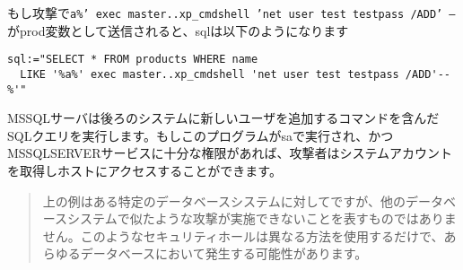 もし攻撃で\texttt{a\%' exec master..xp\_cmdshell 'net user test testpass /ADD' --}がprod変数として送信されると、sqlは以下のようになります


\begin{lstlisting}[numbers=none]
sql:="SELECT * FROM products WHERE name
  LIKE '%a%' exec master..xp_cmdshell 'net user test testpass /ADD'--%'"
\end{lstlisting}

MSSQLサーバは後ろのシステムに新しいユーザを追加するコマンドを含んだSQLクエリを実行します。もしこのプログラムがsaで実行され、かつMSSQLSERVERサービスに十分な権限があれば、攻撃者はシステムアカウントを取得しホストにアクセスすることができます。

\begin{quote}
上の例はある特定のデータベースシステムに対してですが、他のデータベースシステムで似たような攻撃が実施できないことを表すものではありません。このようなセキュリティホールは異なる方法を使用するだけで、あらゆるデータベースにおいて発生する可能性があります。
\end{quote}


